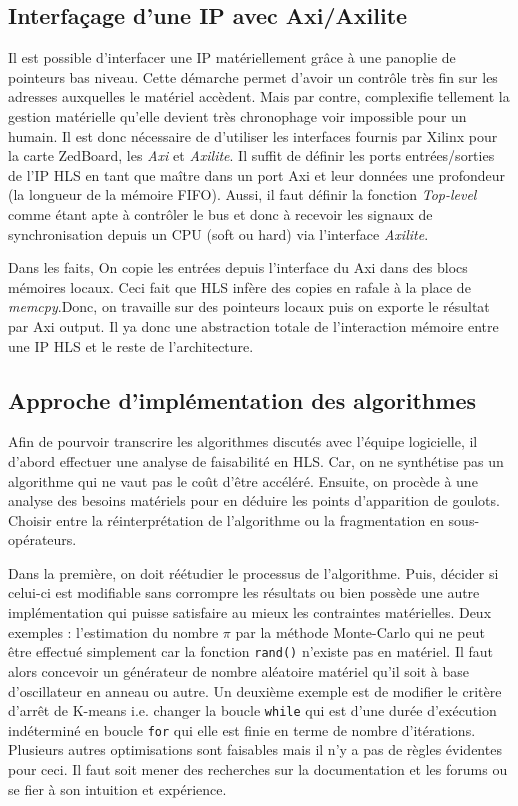 \documentclass[12pt,a4paper]{article}
\begin{document}
\subsection{Interfaçage d'une IP avec Axi/Axilite}
Il est possible d'interfacer une IP matériellement grâce à une panoplie de pointeurs bas niveau. Cette démarche permet d'avoir un contrôle très fin sur les adresses auxquelles le matériel accèdent. Mais par contre, complexifie tellement la gestion matérielle qu'elle devient très chronophage voir impossible pour un humain. Il est donc nécessaire de d'utiliser les interfaces fournis par Xilinx pour la carte ZedBoard, les \textit{Axi} et \textit{Axilite}. Il suffit de définir les ports entrées/sorties de l'IP HLS en tant que maître dans un port Axi et leur données une profondeur (la longueur de la mémoire FIFO). Aussi, il faut définir la fonction \textit{Top-level} comme étant apte à contrôler le bus et donc à recevoir les signaux de synchronisation depuis un CPU (soft ou hard) via l'interface \textit{Axilite}.

Dans les faits, On copie les entrées depuis l'interface du Axi dans des blocs mémoires locaux. Ceci fait que HLS infère des copies en rafale à la place de \textit{memcpy}.Donc, on travaille sur des pointeurs locaux puis on exporte le résultat par Axi output. Il ya donc une abstraction totale de l'interaction mémoire entre une IP HLS et le reste de l'architecture.

\subsection{Approche d'implémentation des algorithmes}
Afin de pourvoir transcrire les algorithmes discutés avec l'équipe logicielle, il d'abord effectuer une analyse de faisabilité en HLS. Car, on ne synthétise  pas un algorithme qui ne vaut pas le coût d'être accéléré. Ensuite, on procède à une analyse des besoins matériels pour en déduire les points d'apparition de goulots. Choisir entre la réinterprétation de l'algorithme ou la fragmentation en sous-opérateurs. 

Dans la première, on doit réétudier le processus de l'algorithme. Puis, décider si celui-ci est modifiable sans corrompre les résultats ou bien possède une autre implémentation qui puisse satisfaire au mieux les contraintes matérielles. Deux exemples : l'estimation du nombre $\pi$ par la méthode Monte-Carlo qui ne peut être effectué simplement car la fonction \texttt{rand()} n'existe pas en matériel. Il faut alors concevoir un générateur de nombre aléatoire matériel qu'il soit à base d'oscillateur en anneau ou autre. Un deuxième exemple est de modifier le critère d'arrêt de K-means i.e. changer la boucle \texttt{while} qui est d'une durée d'exécution indéterminé en boucle \texttt{for} qui elle est finie en terme de nombre d'itérations. Plusieurs autres optimisations sont faisables mais il n'y a pas de règles évidentes pour ceci. Il faut soit mener des recherches sur la documentation et les forums ou se fier à son intuition et expérience.
\end{document}
